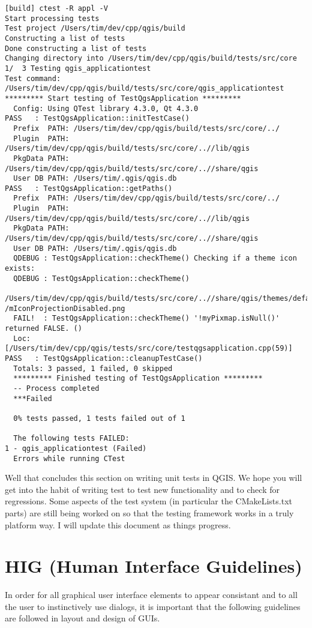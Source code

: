 \begin{verbatim}
[build] ctest -R appl -V
Start processing tests
Test project /Users/tim/dev/cpp/qgis/build
Constructing a list of tests
Done constructing a list of tests
Changing directory into /Users/tim/dev/cpp/qgis/build/tests/src/core
1/  3 Testing qgis_applicationtest          
Test command: /Users/tim/dev/cpp/qgis/build/tests/src/core/qgis_applicationtest
********* Start testing of TestQgsApplication *********
  Config: Using QTest library 4.3.0, Qt 4.3.0
PASS   : TestQgsApplication::initTestCase()
  Prefix  PATH: /Users/tim/dev/cpp/qgis/build/tests/src/core/../
  Plugin  PATH: /Users/tim/dev/cpp/qgis/build/tests/src/core/..//lib/qgis
  PkgData PATH: /Users/tim/dev/cpp/qgis/build/tests/src/core/..//share/qgis
  User DB PATH: /Users/tim/.qgis/qgis.db
PASS   : TestQgsApplication::getPaths()
  Prefix  PATH: /Users/tim/dev/cpp/qgis/build/tests/src/core/../
  Plugin  PATH: /Users/tim/dev/cpp/qgis/build/tests/src/core/..//lib/qgis
  PkgData PATH: /Users/tim/dev/cpp/qgis/build/tests/src/core/..//share/qgis
  User DB PATH: /Users/tim/.qgis/qgis.db
  QDEBUG : TestQgsApplication::checkTheme() Checking if a theme icon exists:
  QDEBUG : TestQgsApplication::checkTheme() 
  /Users/tim/dev/cpp/qgis/build/tests/src/core/..//share/qgis/themes/default/
/mIconProjectionDisabled.png
  FAIL!  : TestQgsApplication::checkTheme() '!myPixmap.isNull()' returned FALSE. ()
  Loc: [/Users/tim/dev/cpp/qgis/tests/src/core/testqgsapplication.cpp(59)]
PASS   : TestQgsApplication::cleanupTestCase()
  Totals: 3 passed, 1 failed, 0 skipped
  ********* Finished testing of TestQgsApplication *********
  -- Process completed
  ***Failed

  0% tests passed, 1 tests failed out of 1

  The following tests FAILED:
1 - qgis_applicationtest (Failed)
  Errors while running CTest
\end{verbatim}

Well that concludes this section on writing unit tests in QGIS. We hope you
will get into the habit of writing test to test new functionality and to check
for regressions. Some aspects of the test system (in particular the
CMakeLists.txt parts) are still being worked on so that the testing framework
works in a truly platform way. I will update this document as things
progress.


\hypertarget{toc54}{}
\section{HIG (Human Interface Guidelines)}
In order for all graphical user interface elements to appear consistant and to
all the user to instinctively use dialogs, it is important that the following
guidelines are followed in layout and design of GUIs.


